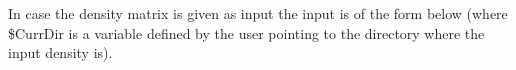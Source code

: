 In case the density matrix is given as input the input is of the
form below (where \$CurrDir is a variable defined by the user pointing
to the directory where the input density is).


